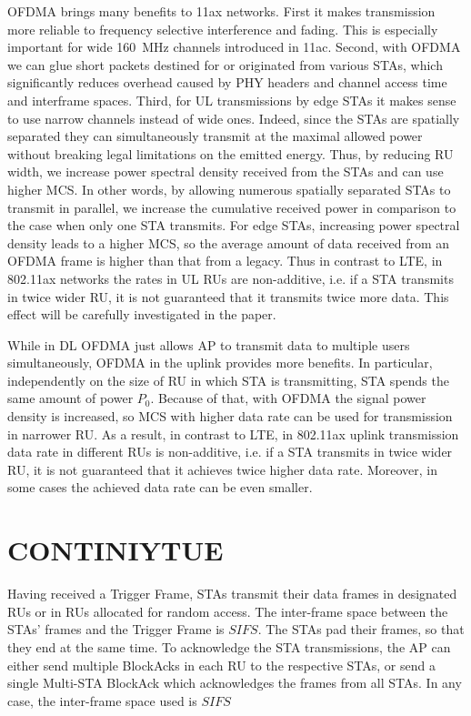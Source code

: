 OFDMA brings many benefits to 11ax networks.
First it makes transmission more reliable to frequency selective interference and fading.
This is especially important for wide \SI{160}{MHz} channels introduced in 11ac.
Second, with OFDMA we can glue short packets destined for or originated from various STAs, which significantly reduces overhead caused by PHY headers and channel access time and interframe spaces.
Third, for UL transmissions by edge STAs it makes sense to use narrow channels instead of wide ones.
Indeed, since the STAs are spatially separated they can simultaneously transmit at the maximal allowed power without breaking legal limitations on the emitted energy.
Thus, by reducing RU width, we increase power spectral density received from the STAs and can use higher MCS.
In other words, by allowing numerous spatially separated STAs to transmit in parallel, we increase the cumulative received power in comparison to the case when only one STA transmits.
For edge STAs, increasing power spectral density leads to a higher MCS, so  the average amount of data received from an OFDMA frame is higher than that from a legacy.
Thus in contrast to LTE, in 802.11ax networks the rates in UL RUs are non-additive, i.e. if a STA transmits in twice wider RU, it is not guaranteed that it transmits twice more data.
This effect will be carefully investigated in the paper.

While in DL OFDMA just allows AP to transmit data to multiple users simultaneously, OFDMA in the uplink provides more benefits. In particular, independently on the size of RU in which STA is transmitting, STA spends the same amount of power $P_0$. Because of that, with OFDMA the signal power density is increased, so MCS with higher data rate can be used for transmission in narrower RU. As a result, in contrast to LTE, in 802.11ax uplink transmission data rate in different RUs is non-additive, i.e. if a STA transmits in twice wider RU, it is not guaranteed that it achieves twice higher data rate. Moreover, in some cases the achieved data rate can be even smaller.

\clearpage
\section{CONTINIYTUE}


Having received a Trigger Frame, STAs transmit their data frames in designated RUs or in RUs allocated for random access.
The inter-frame space between the STAs' frames and the Trigger Frame is $SIFS$.
The STAs pad their frames, so that they end at the same time.
To acknowledge the STA transmissions, the AP can either send multiple BlockAcks in each RU to the respective STAs, or send a single Multi-STA BlockAck which acknowledges the frames from all STAs.
In any case, the inter-frame space used is $SIFS$

